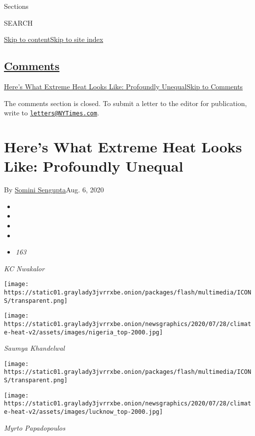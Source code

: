 Sections

SEARCH

\protect\hyperlink{site-content}{Skip to
content}\protect\hyperlink{site-index}{Skip to site index}

\hypertarget{comments}{%
\subsection{\texorpdfstring{\protect\hyperlink{commentsContainer}{Comments}}{Comments}}\label{comments}}

\href{}{Here's What Extreme Heat Looks Like: Profoundly
Unequal}\href{}{Skip to Comments}

The comments section is closed. To submit a letter to the editor for
publication, write to
\href{mailto:letters@NYTimes.com}{\nolinkurl{letters@NYTimes.com}}.

\hypertarget{heres-what-extreme-heat-looks-like-profoundly-unequal}{%
\section{Here's What Extreme Heat Looks Like: Profoundly
Unequal}\label{heres-what-extreme-heat-looks-like-profoundly-unequal}}

By \href{https://www.nytimes3xbfgragh.onion/by/somini-sengupta}{Somini
Sengupta}Aug. 6, 2020

\begin{itemize}
\item
\item
\item
\item
\item
  \emph{163}
\end{itemize}

\emph{KC Nwakalor}

\texttt{[image: https://static01.graylady3jvrrxbe.onion/packages/flash/multimedia/ICONS/transparent.png]}

\texttt{[image: https://static01.graylady3jvrrxbe.onion/newsgraphics/2020/07/28/climate-heat-v2/assets/images/nigeria\_top-2000.jpg]}

\emph{Saumya Khandelwal}

\texttt{[image: https://static01.graylady3jvrrxbe.onion/packages/flash/multimedia/ICONS/transparent.png]}

\texttt{[image: https://static01.graylady3jvrrxbe.onion/newsgraphics/2020/07/28/climate-heat-v2/assets/images/lucknow\_top-2000.jpg]}

\emph{Myrto Papadopoulos}


